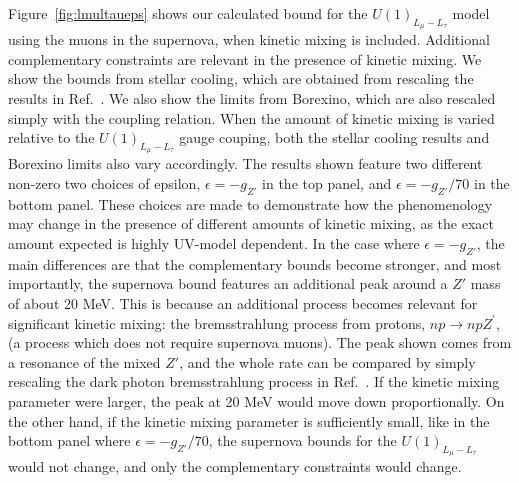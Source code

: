 \documentclass[11pt]{article}
\begin{document}
Figure~\ref{fig:lmultaueps} shows our calculated bound for the $U(1)_{L_\mu-L_\tau}$ model using the muons in the supernova, when kinetic mixing is included. Additional complementary constraints are relevant in the presence of kinetic mixing. We show the bounds from stellar cooling, which are obtained from rescaling the results in Ref.~\cite{An:2013yfc}. We also show the limits from Borexino, which are also rescaled simply with the coupling relation. When the amount of kinetic mixing is varied relative to the $U(1)_{L_\mu-L_\tau}$ gauge couping, both the stellar cooling results and Borexino limits also vary accordingly. The results shown feature two different non-zero two choices of epsilon, $\epsilon=-g_{Z'}$ in the top panel, and $\epsilon=-g_{Z'}/70$ in the bottom panel. These choices are made to demonstrate how the phenomenology may change in the presence of different amounts of kinetic mixing, as the exact amount expected is highly UV-model dependent.
In the case where $\epsilon=-g_{Z'}$, the main differences are that the complementary bounds become stronger, and most importantly, the supernova bound features an additional peak around a $Z'$ mass of about 20 MeV. This is because an additional process becomes relevant for significant kinetic mixing: the bremsstrahlung process from protons, $np\rightarrow np Z^\prime$, (a process which does not require supernova muons). The peak shown comes from a resonance of the mixed $Z'$, and the whole rate can be compared by simply rescaling the dark photon bremsstrahlung process in Ref.~\cite{Chang:2016ntp}. If the kinetic mixing parameter were larger, the peak at 20 MeV would move down proportionally. On the other hand, if the kinetic mixing parameter is sufficiently small, like in the bottom panel where  $\epsilon=-g_{Z'}/70$, the supernova bounds for the $U(1)_{L_\mu-L_\tau}$ would not change, and only the complementary constraints would change. 
\end{document}
